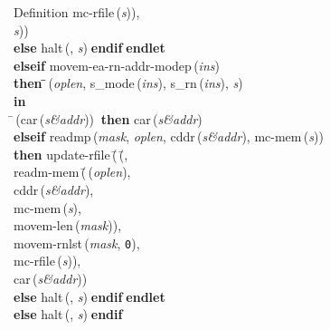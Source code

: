 \begin{tabbing}{\sc Definition}
{\rm{mc-rfile}}\,({\it{s\/}}))\-, \\ 
{\it{s\/}})\-)\- \\ 
{\bf else }{\rm{halt}}\,({}, {\it{s\/}})$\;${\bf  endif}\-$\;${\bf  endlet}\- \\ 
{\bf elseif }{\rm{movem-ea-rn-addr-modep}}\,({\it{ins\/}}) \\ 
{\bf then }\=\=\,({\it{oplen\/}}, {\rm{s\_mode}}\,({\it{ins\/}}), {\rm{s\_rn}}\,({\it{ins\/}}), {\it{s\/}})\- \\ 
{\bf in} \\ 
\=\,({\rm{car}}\,({\it{s\&addr\/}}))$\;\;${\bf then }{\rm{car}}\,({\it{s\&addr\/}}) \\ 
{\bf elseif }{\rm{readmp}}\,({\it{mask\/}}, {\it{oplen\/}}, {\rm{cddr}}\,({\it{s\&addr\/}}), {\rm{mc-mem}}\,({\it{s\/}})) \\ 
{\bf then }{\rm{update-rfile}}\,(\=\,(\=, \\ 
{\rm{readm-mem}}\,(\=\,({\it{oplen\/}}), \\ 
{\rm{cddr}}\,({\it{s\&addr\/}}), \\ 
{\rm{mc-mem}}\,({\it{s\/}}), \\ 
{\rm{movem-len}}\,({\it{mask\/}}))\-, \\ 
{\rm{movem-rnlst}}\,({\it{mask\/}}, {\tt{0}}), \\ 
{\rm{mc-rfile}}\,({\it{s\/}}))\-, \\ 
{\rm{car}}\,({\it{s\&addr\/}}))\- \\ 
{\bf else }{\rm{halt}}\,({}, {\it{s\/}})$\;${\bf  endif}\-$\;${\bf  endlet}\- \\ 
{\bf else }{\rm{halt}}\,({}, {\it{s\/}})$\;${\bf  endif}\-\-
\end{tabbing}

